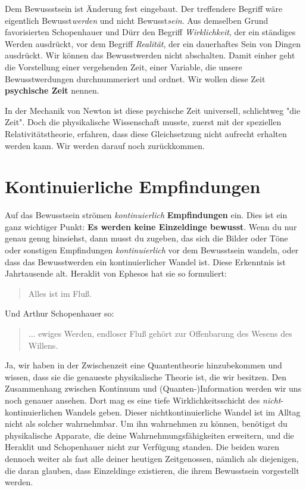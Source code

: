 \documentclass[12pt]{book}
\begin{document}
Dem Bewussstsein ist Änderung fest eingebaut. Der treffendere Begriff wäre eigentlich Bewusst\emph{werden} und nicht Bewusst\emph{sein}. Aus demselben Grund favorisierten Schopenhauer und Dürr den Begriff \emph{Wirklichkeit}, der ein ständiges Werden ausdrückt, vor dem Begriff \emph{Realität}, der ein dauerhaftes Sein von Dingen ausdrückt. Wir können das Bewusstwerden nicht abschalten. Damit einher geht die Vorstellung einer vergehenden Zeit, einer Variable, die unsere Bewusstwerdungen durchnummeriert und ordnet. Wir wollen diese Zeit \textbf{psychische Zeit} nennen.

In der Mechanik von Newton ist diese psychische Zeit universell, schlichtweg "die Zeit". Doch die physikalische Wissenschaft musste, zuerst mit der speziellen Relativitätstheorie, erfahren, dass diese Gleichsetzung nicht aufrecht erhalten werden kann. Wir werden darauf noch zurückkommen.

\section{Kontinuierliche Empfindungen}

Auf das Bewusstsein strömen \emph{kontinuierlich} \textbf{Empfindungen} ein. Dies ist ein ganz wichtiger Punkt: \textbf{Es werden keine Einzeldinge bewusst}. Wenn du nur genau genug hinsiehst, dann musst du zugeben, das sich die Bilder oder Töne oder sonstigen Empfindungen \emph{kontinuierlich} vor dem Bewusstsein wandeln, oder dass das Bewusstwerden ein kontinuierlicher Wandel ist. Diese Erkenntnis ist Jahrtausende alt. Heraklit von Ephesos hat sie so formuliert:

\begin{quote}\begin{tcolorbox}
Alles ist im Fluß.
\end{tcolorbox}\end{quote}

Und Arthur Schopenhauer so:

\begin{quote}\begin{tcolorbox}
... ewiges Werden, endloser Fluß gehört zur Offenbarung des Wesens des Willens.
\end{tcolorbox}\end{quote}

Ja, wir haben in der Zwischenzeit eine Quantentheorie hinzubekommen und wissen, dass sie die genaueste physikalische Theorie ist, die wir besitzen. Den Zusammenhang zwischen Kontinuum und (Quanten-)Information werden wir uns noch genauer ansehen. Dort mag es eine tiefe Wirklichkeitsschicht des \emph{nicht}-kontinuierlichen Wandels geben. Dieser nichtkontinuierliche Wandel ist im Alltag nicht als solcher wahrnehmbar. Um ihn wahrnehmen zu können, benötigst du physikalische Apparate, die deine Wahrnehmungsfähigkeiten erweitern, und die Heraklit und Schopenhauer nicht zur Verfügung standen. Die beiden waren dennoch weiter als fast alle deiner heutigen Zeitgenossen, nämlich als diejenigen, die daran glauben, dass Einzeldinge existieren, die ihrem Bewusstsein vorgestellt werden.
\end{document}

